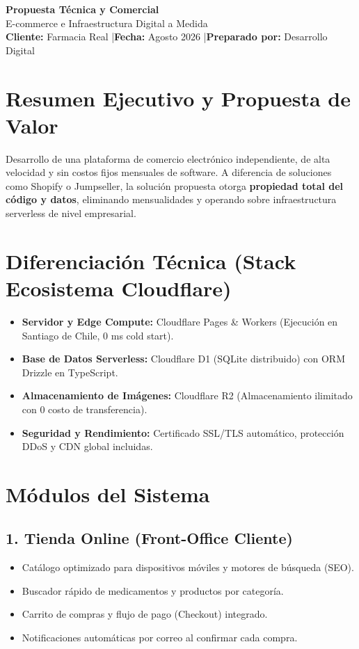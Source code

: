 \documentclass[11pt,a4paper]{article}
\begin{document}
\begin{center}
    {\LARGE \bfseries Propuesta Técnica y Comercial}\\[0.3em]
    {\Large \color{primary} E-commerce e Infraestructura Digital a Medida}\\[0.5em]
    {\small \textbf{Cliente:} Farmacia Real \quad|\quad \textbf{Fecha:} Agosto 2026 \quad|\quad \textbf{Preparado por:} Desarrollo Digital}
\end{center}

\vspace{0.5em}

\section{Resumen Ejecutivo y Propuesta de Valor}
Desarrollo de una plataforma de comercio electrónico independiente, de alta velocidad y sin costos fijos mensuales de software. A diferencia de soluciones como Shopify o Jumpseller, la solución propuesta otorga \textbf{propiedad total del código y datos}, eliminando mensualidades y operando sobre infraestructura serverless de nivel empresarial.

\section{Diferenciación Técnica (Stack Ecosistema Cloudflare)}
\begin{itemize}[leftmargin=1.5em]
    \item \textbf{Servidor y Edge Compute:} Cloudflare Pages \& Workers (Ejecución en Santiago de Chile, 0 ms cold start).
    \item \textbf{Base de Datos Serverless:} Cloudflare D1 (SQLite distribuido) con ORM Drizzle en TypeScript.
    \item \textbf{Almacenamiento de Imágenes:} Cloudflare R2 (Almacenamiento ilimitado con 0 costo de transferencia).
    \item \textbf{Seguridad y Rendimiento:} Certificado SSL/TLS automático, protección DDoS y CDN global incluidas.
\end{itemize}

\section{Módulos del Sistema}

\subsection{1. Tienda Online (Front-Office Cliente)}
\begin{itemize}[leftmargin=1.5em]
    \item Catálogo optimizado para dispositivos móviles y motores de búsqueda (SEO).
    \item Buscador rápido de medicamentos y productos por categoría.
    \item Carrito de compras y flujo de pago (Checkout) integrado.
    \item Notificaciones automáticas por correo al confirmar cada compra.
\end{itemize}
\end{document}
